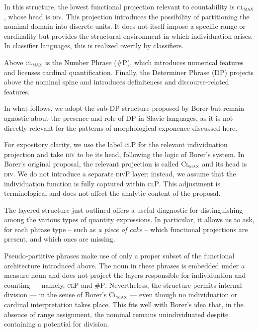 \documentclass[output=paper,colorlinks,citecolor=brown
]{langscibook}
\begin{document}
\noindent In this structure, the lowest functional projection relevant to countability is \textsc{cl}$_{\textsc{max}}$, whose head is \textsc{div}. This projection introduces the possibility of partitioning the nominal domain into discrete units. It does not itself impose a specific range or cardinality but provides the structural environment in which individuation arises. In classifier languages, this is realized overtly by classifiers.

Above \textsc{cl}$_{\textsc{max}}$ is the Number Phrase (\textsc{\#P}), which introduces numerical features and licenses cardinal quantification. Finally, the Determiner Phrase (\textsc{DP}) projects above the nominal spine and introduces definiteness and discourse-related features.

In what follows, we adopt the sub-\textsc{DP} structure proposed by Borer but remain agnostic about the presence and role of \textsc{DP} in Slavic languages, as it is not directly relevant for the patterns of morphological exponence discussed here.

For expository clarity, we use the label \textsc{clP} for the relevant individuation projection and take \textsc{div} to be its head, following the logic of Borer’s system. In Borer’s original proposal, the relevant projection is called \textsc{Cl}$_\textsc{max}$ and its head is \textsc{div}. We do not introduce a separate \textsc{divP} layer; instead, we assume that the individuation function is fully captured within \textsc{clP}. This adjustment is terminological and does not affect the analytic content of the proposal.

The layered structure just outlined offers a useful diagnostic for distinguishing among the various types of quantity expressions. In particular, it allows us to ask, for each phrase type -- such as \textit{a piece of cake} -- which functional projections are present, and which ones are missing.

Pseudo-partitive phrases make use of only a proper subset of the functional architecture introduced above. The noun in these phrases is embedded under a measure noun and does not project the layers responsible for individuation and counting — namely, \textsc{clP} and \textsc{\#P}. Nevertheless, the structure permits internal division — in the sense of Borer’s \textsc{Cl}$_\textsc{max}$ — even though no individuation or cardinal interpretation takes place. This fits well with Borer’s idea that, in the absence of range assignment, the nominal remains unindividuated despite containing a potential for division.
\end{document}
